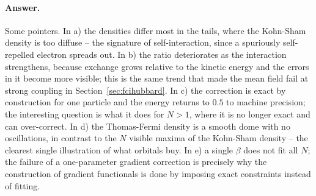 \paragraph{Answer.}
Some pointers.  In a) the densities differ most in the tails, where the
Kohn-Sham density is too diffuse -- the signature of self-interaction, since a
spuriously self-repelled electron spreads out.  In b) the ratio deteriorates
as the interaction strengthens, because exchange grows relative to the
kinetic energy and the errors in it become more visible; this is the same
trend that made the mean field fail at strong coupling in
Section~\ref{sec:fcihubbard}.  In c) the correction is exact by construction
for one particle and the energy returns to $0.5$ to machine precision; the
interesting question is what it does for $N>1$, where it is no longer exact
and can over-correct.  In d) the Thomas-Fermi density is a smooth dome with
no oscillations, in contrast to the $N$ visible maxima of the Kohn-Sham
density -- the clearest single illustration of what orbitals buy.  In e) a
single $\beta$ does not fit all $N$; the failure of a one-parameter gradient
correction is precisely why the construction of gradient functionals is done
by imposing exact constraints instead of fitting.
